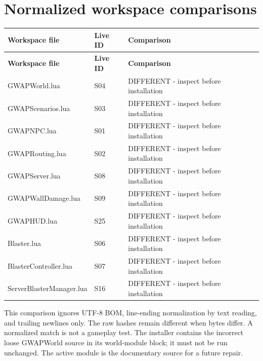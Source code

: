 \section{Normalized workspace comparisons}
\begin{longtable}{p{}p{}p{}}
\toprule
\textbf{Workspace file} & \textbf{Live ID} & \textbf{Comparison} \\ \midrule
\endfirsthead
\textbf{Workspace file} & \textbf{Live ID} & \textbf{Comparison} \\ \midrule
\endhead
GWAPWorld.\allowbreak{}lua & S04 & DIFFERENT - inspect before installation \\
GWAPScenarios.\allowbreak{}lua & S03 & DIFFERENT - inspect before installation \\
GWAPNPC.\allowbreak{}lua & S01 & DIFFERENT - inspect before installation \\
GWAPRouting.\allowbreak{}lua & S02 & DIFFERENT - inspect before installation \\
GWAPServer.\allowbreak{}lua & S08 & DIFFERENT - inspect before installation \\
GWAPWallDamage.\allowbreak{}lua & S09 & DIFFERENT - inspect before installation \\
GWAPHUD.\allowbreak{}lua & S25 & DIFFERENT - inspect before installation \\
Blaster.\allowbreak{}lua & S06 & DIFFERENT - inspect before installation \\
BlasterController.\allowbreak{}lua & S07 & DIFFERENT - inspect before installation \\
ServerBlasterManager.\allowbreak{}lua & S16 & DIFFERENT - inspect before installation \\
\bottomrule
\end{longtable}
This comparison ignores UTF-8 BOM, line-ending normalization by text reading, and trailing newlines only.\allowbreak{} The raw hashes remain different when bytes differ.\allowbreak{} A normalized match is not a gameplay test.\allowbreak{} The installer contains the incorrect loose GWAPWorld source in its world-module block; it must not be run unchanged.\allowbreak{} The active module is the documentary source for a future repair.\allowbreak{}

